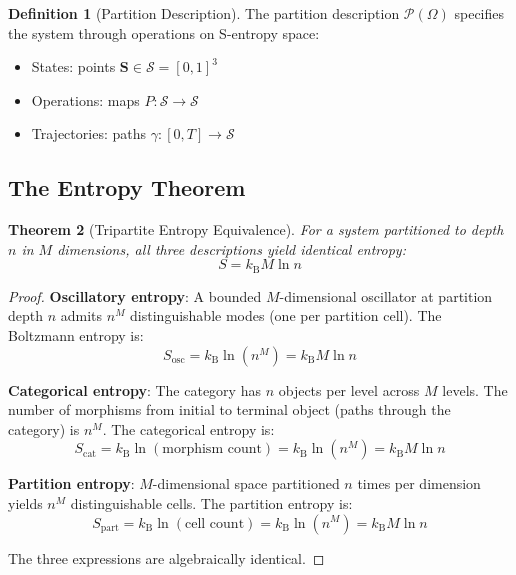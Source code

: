 \documentclass[10pt,twocolumn]{article}
\theoremstyle{plain}
\newtheorem{theorem}{Theorem}[section]
\theoremstyle{definition}
\newtheorem{definition}[theorem]{Definition}
\theoremstyle{remark}
\newcommand{\kB}{k_{\mathrm{B}}}
\newcommand{\Sspace}{\mathcal{S}}
\newcommand{\Scoord}{\mathbf{S}}
\newcommand{\Pcat}{\mathcal{P}}
\begin{document}
\begin{definition}[Partition Description]
\label{def:partition}
The partition description $\Pcat(\Omega)$ specifies the system through operations on S-entropy space:
\begin{itemize}
\item States: points $\Scoord \in \Sspace = [0,1]^3$
\item Operations: maps $P: \Sspace \to \Sspace$
\item Trajectories: paths $\gamma: [0,T] \to \Sspace$
\end{itemize}
\end{definition}

\subsection{The Entropy Theorem}

\begin{theorem}[Tripartite Entropy Equivalence]
\label{thm:entropy}
For a system partitioned to depth $n$ in $M$ dimensions, all three descriptions yield identical entropy:
\begin{equation}
S = \kB M \ln n
\label{eq:entropy_identity}
\end{equation}
\end{theorem}

\begin{proof}
\textbf{Oscillatory entropy}: A bounded $M$-dimensional oscillator at partition depth $n$ admits $n^M$ distinguishable modes (one per partition cell). The Boltzmann entropy is:
\begin{equation}
S_{\mathrm{osc}} = \kB \ln(n^M) = \kB M \ln n
\end{equation}

\textbf{Categorical entropy}: The category has $n$ objects per level across $M$ levels. The number of morphisms from initial to terminal object (paths through the category) is $n^M$. The categorical entropy is:
\begin{equation}
S_{\mathrm{cat}} = \kB \ln(\text{morphism count}) = \kB \ln(n^M) = \kB M \ln n
\end{equation}

\textbf{Partition entropy}: $M$-dimensional space partitioned $n$ times per dimension yields $n^M$ distinguishable cells. The partition entropy is:
\begin{equation}
S_{\mathrm{part}} = \kB \ln(\text{cell count}) = \kB \ln(n^M) = \kB M \ln n
\end{equation}

The three expressions are algebraically identical.
\end{proof}
\end{document}
